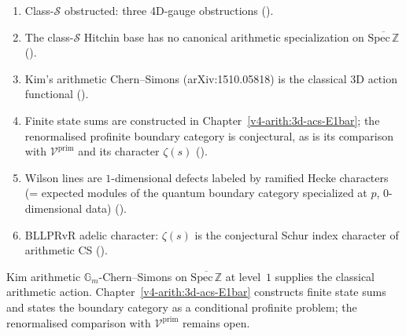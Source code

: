 \begin{enumerate}
\item Class-\(\mathcal{S}\) obstructed: three 4D-gauge obstructions
().
\item The class-\(\mathcal S\) Hitchin base has no canonical
arithmetic specialization on \(\overline{\mathrm{Spec}\,\mathbb Z}\)
().
\item Kim's arithmetic Chern--Simons (arXiv:1510.05818) is the
classical 3D action functional
().
\item Finite state sums are constructed in
Chapter~\ref{v4-arith:3d-acs-E1bar}; the renormalised profinite
boundary category is conjectural, as is its comparison with
\(\mathcal{V}^{\mathrm{prim}}\) and its character \(\zeta(s)\)
().
\item Wilson lines are \(1\)-dimensional defects labeled by ramified
Hecke characters (= expected modules of the quantum boundary
category specialized at \(p\), \(0\)-dimensional data)
().
\item BLLPRvR adelic character: \(\zeta(s)\) is the conjectural Schur
index character of arithmetic CS
().
\end{enumerate}

Kim arithmetic \(\mathbb{G}_{m}\)-Chern--Simons on
\(\overline{\mathrm{Spec}\,\mathbb{Z}}\) at level~\(1\) supplies the
classical arithmetic action. Chapter~\ref{v4-arith:3d-acs-E1bar}
constructs finite state sums and states the boundary category as a
conditional profinite problem; the renormalised comparison with
\(\mathcal{V}^{\mathrm{prim}}\) remains open.
